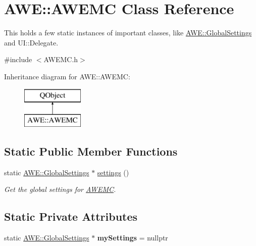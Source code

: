 \hypertarget{class_a_w_e_1_1_a_w_e_m_c}{\section{A\-W\-E\-:\-:A\-W\-E\-M\-C Class Reference}
\label{class_a_w_e_1_1_a_w_e_m_c}
}


This holds a few static instances of important classes, like {\ttfamily \hyperlink{class_a_w_e_1_1_global_settings}{A\-W\-E\-::\-Global\-Settings}} and {\ttfamily U\-I\-::\-Delegate}.  




{\ttfamily \#include $<$A\-W\-E\-M\-C.\-h$>$}

Inheritance diagram for A\-W\-E\-:\-:A\-W\-E\-M\-C\-:\begin{figure}[H]
\begin{center}
\leavevmode
\includegraphics[height=2.000000cm]{class_a_w_e_1_1_a_w_e_m_c}
\end{center}
\end{figure}
\subsection*{Static Public Member Functions}
\begin{DoxyCompactItemize}
\item 
static \hyperlink{class_a_w_e_1_1_global_settings}{A\-W\-E\-::\-Global\-Settings} $\ast$ \hyperlink{class_a_w_e_1_1_a_w_e_m_c_a9cbf26324e0864a34aee18fc3a6abdab}{settings} ()
\begin{DoxyCompactList}\small\item\em Get the global settings for \hyperlink{class_a_w_e_1_1_a_w_e_m_c}{A\-W\-E\-M\-C}. \end{DoxyCompactList}\end{DoxyCompactItemize}
\subsection*{Static Private Attributes}
\begin{DoxyCompactItemize}
\item 
\hypertarget{class_a_w_e_1_1_a_w_e_m_c_a4fc32d157958976c44f1ed80343ab0cd}{static \hyperlink{class_a_w_e_1_1_global_settings}{A\-W\-E\-::\-Global\-Settings} $\ast$ {\bfseries my\-Settings} = nullptr}\label{class_a_w_e_1_1_a_w_e_m_c_a4fc32d157958976c44f1ed80343ab0cd}

\end{DoxyCompactItemize}
